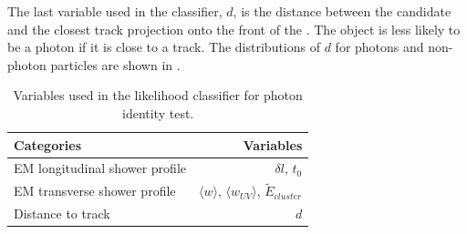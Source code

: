 The last variable used in the classifier, $d$, is the distance between the candidate and the closest track projection onto the front of the \ECAL. The \ShowerPeak object is less likely to be a photon if it is close to a track. The distributions of $d$ for photons and non-photon particles are shown in .


\begin{table}[htbp] \centering \smallskip
\begin{tabular}{l r }
\hline
\hline
Categories&  Variables\\
\hline
EM longitudinal  shower profile & $\delta{l}$, $t_0$ \\
EM transverse  shower profile & $\langle{w}\rangle$, ${\langle{w_{UV}}\rangle}$, $\tilde{E}_{cluster}$ \\
Distance to track &  $d$ \\
\hline
\hline
\end{tabular}
\caption
{Variables used in the likelihood classifier for photon identity test.}
\label{tab:photonPhotonIDvar}
\end{table}

